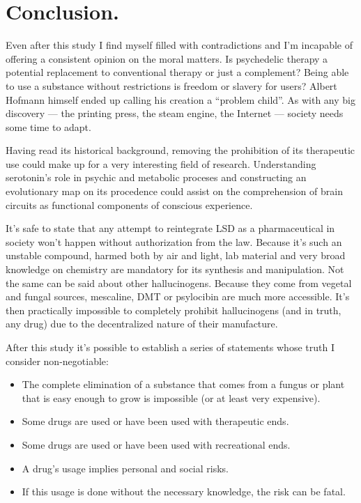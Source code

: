 \section{Conclusion.}

Even after this study I find myself filled with contradictions and I'm incapable of offering a consistent opinion on the moral matters. Is psychedelic therapy a potential replacement to conventional therapy or just a complement? Being able to use a substance without restrictions is freedom or slavery for users? Albert Hofmann himself ended up calling his creation a \enquote{problem child}. As with any big discovery --- the printing press, the steam engine, the Internet --- society needs some time to adapt.

Having read its historical background, removing the prohibition of its therapeutic use could make up for a very interesting field of research. Understanding serotonin's role in psychic and metabolic proceses and constructing an evolutionary map on its procedence could assist on the comprehension of brain circuits as functional components of conscious experience.

It's safe to state that any attempt to reintegrate LSD as a pharmaceutical in society won't happen without authorization from the law. Because it's such an unstable compound, harmed both by air and light, lab material and very broad knowledge on chemistry are mandatory for its synthesis and manipulation. Not the same can be said about other hallucinogens. Because they come from vegetal and fungal sources, mescaline, DMT or psylocibin are much more accessible. It's then practically impossible to completely prohibit hallucinogens (and in truth, any drug) due to the decentralized nature of their manufacture.

After this study it's possible to establish a series of statements whose truth I consider non-negotiable:

\begin{itemize}
	\item The complete elimination of a substance that comes from a fungus or plant that is easy enough to grow is impossible (or at least very expensive).
	\item Some drugs are used or have been used with therapeutic ends.
	\item Some drugs are used or have been used with recreational ends.
	\item A drug's usage implies personal and social risks.
	\item If this usage is done without the necessary knowledge, the risk can be fatal.
\end{itemize}

